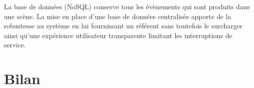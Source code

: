 La base de données (\gls{NoSQL}) conserve tous les évènements qui 
sont produits dans une scène. 
La mise en place d'une base de données centralisée apporte de la robustesse au 
système en lui fournissant un référent sans toutefois le surcharger ainsi qu'une 
expérience utilisateur transparente limitant les interruptions de service.
\section{Bilan}


